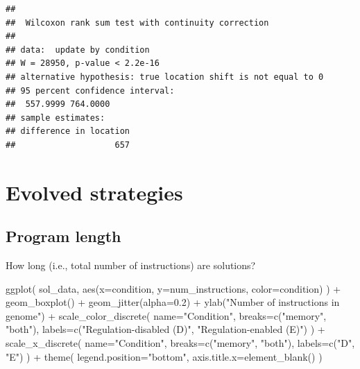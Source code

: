 \documentclass[
]{book}
\newenvironment{Shaded}{\begin{snugshade}}{\end{snugshade}}
\newcommand{\AttributeTok}[1]{\textcolor[rgb]{0.77,0.63,0.00}{#1}}
\newcommand{\FloatTok}[1]{\textcolor[rgb]{0.00,0.00,0.81}{#1}}
\newcommand{\FunctionTok}[1]{\textcolor[rgb]{0.00,0.00,0.00}{#1}}
\newcommand{\NormalTok}[1]{#1}
\newcommand{\SpecialCharTok}[1]{\textcolor[rgb]{0.00,0.00,0.00}{#1}}
\newcommand{\StringTok}[1]{\textcolor[rgb]{0.31,0.60,0.02}{#1}}
\begin{document}
\begin{verbatim}
## 
##  Wilcoxon rank sum test with continuity correction
## 
## data:  update by condition
## W = 28950, p-value < 2.2e-16
## alternative hypothesis: true location shift is not equal to 0
## 95 percent confidence interval:
##  557.9999 764.0000
## sample estimates:
## difference in location 
##                    657
\end{verbatim}

\hypertarget{evolved-strategies}{%
\section{Evolved strategies}\label{evolved-strategies}}

\hypertarget{program-length-1}{%
\subsection{Program length}\label{program-length-1}}

How long (i.e., total number of instructions) are solutions?

\begin{Shaded}
\begin{Highlighting}[]
\FunctionTok{ggplot}\NormalTok{( sol\_data, }\FunctionTok{aes}\NormalTok{(}\AttributeTok{x=}\NormalTok{condition, }\AttributeTok{y=}\NormalTok{num\_instructions, }\AttributeTok{color=}\NormalTok{condition) ) }\SpecialCharTok{+}
  \FunctionTok{geom\_boxplot}\NormalTok{() }\SpecialCharTok{+}
  \FunctionTok{geom\_jitter}\NormalTok{(}\AttributeTok{alpha=}\FloatTok{0.2}\NormalTok{) }\SpecialCharTok{+}
  \FunctionTok{ylab}\NormalTok{(}\StringTok{"Number of instructions in genome"}\NormalTok{) }\SpecialCharTok{+}
  \FunctionTok{scale\_color\_discrete}\NormalTok{(}
    \AttributeTok{name=}\StringTok{"Condition"}\NormalTok{,}
    \AttributeTok{breaks=}\FunctionTok{c}\NormalTok{(}\StringTok{"memory"}\NormalTok{, }\StringTok{"both"}\NormalTok{),}
    \AttributeTok{labels=}\FunctionTok{c}\NormalTok{(}\StringTok{"Regulation{-}disabled (D)"}\NormalTok{, }\StringTok{"Regulation{-}enabled (E)"}\NormalTok{)}
\NormalTok{  ) }\SpecialCharTok{+}
  \FunctionTok{scale\_x\_discrete}\NormalTok{(}
    \AttributeTok{name=}\StringTok{"Condition"}\NormalTok{,}
    \AttributeTok{breaks=}\FunctionTok{c}\NormalTok{(}\StringTok{"memory"}\NormalTok{, }\StringTok{"both"}\NormalTok{),}
    \AttributeTok{labels=}\FunctionTok{c}\NormalTok{(}\StringTok{"D"}\NormalTok{, }\StringTok{"E"}\NormalTok{)}
\NormalTok{  ) }\SpecialCharTok{+}
  \FunctionTok{theme}\NormalTok{(}
    \AttributeTok{legend.position=}\StringTok{"bottom"}\NormalTok{,}
    \AttributeTok{axis.title.x=}\FunctionTok{element\_blank}\NormalTok{()}
\NormalTok{  )}
\end{Highlighting}
\end{Shaded}
\end{document}
